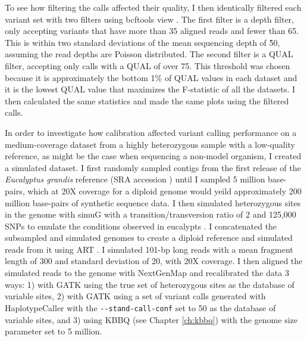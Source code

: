 To see how filtering the calls affected their quality, I then identically filtered each variant set with two filters using bcftools view \parencite{li_sequence_2009}. The first filter is a depth filter, only accepting variants that have more than 35 aligned reads and fewer than 65. This is within two standard deviations of the mean sequencing depth of \~50, assuming the read depths are Poisson distributed. The second filter is a QUAL filter, accepting only calls with a QUAL of over 75. This threshold was chosen because it is approximately the bottom 1\% of QUAL values in each dataset and it is the lowest QUAL value that maximizes the F-statistic of all the datasets. I then calculated the same statistics and made the same plots using the filtered calls.



%
In order to investigate how calibration affected variant calling performance on a medium-coverage dataset from a highly heterozygous sample with a low-quality reference, as might be the case when sequencing a non-model organism, I created a simulated dataset. I first randomly sampled contigs from the first release of the \textit{Eucalyptus grandis} reference (SRA accession ) until I sampled 5 million base-pairs, which at 20X coverage for a diploid genome would yeild approximately 200 million base-pairs of synthetic sequence data. I then simulated heterozygous sites in the genome with simuG \parencite{yue_simug_2019} with a transition/transversion ratio of 2 and 125,000 SNPs to emulate the conditions observed in eucalypts \parencite{kulheim_comparative_2009}. I concatenated the subsampled and simulated genomes to create a diploid reference and simulated reads from it using ART \parencite{huang_art_2012}. I simulated 101-bp long reads with a mean fragment length of 300 and standard deviation of 20, with 20X coverage. I then aligned the simulated reads to the genome with NextGenMap \parencite{sedlazeck_nextgenmap_2013} and recalibrated the data 3 ways: 1) with GATK using the true set of heterozygous sites as the database of variable sites, 2) with GATK using a set of variant calls generated with HaplotypeCaller with the \texttt{-\phantom{}-stand-call-conf} set to 50 as the database of variable sites, and 3) using KBBQ (see Chapter \ref{ch:kbbq}) with the genome size parameter set to 5 million.

